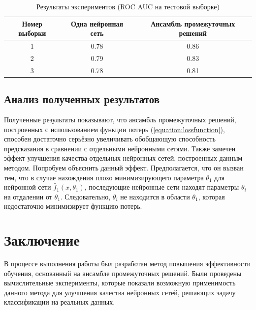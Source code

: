\documentclass[12pt, fleqn]{article}
\newcommand{\predictionfunction}{\hat{f}}
\newcommand{\reference}[1]{(\hyperref[#1]{\ref{#1}})}
\begin{document}
\begin{table}[h!]
	\begin{center}
		\begin{tabular}{|c|c|c|}
			\hline
			Номер выборки & Одна нейронная сеть & Ансамбль промежуточных решений \\
			\hline
			1 & 0.78 & 0.86 \\
			\hline
			2 & 0.79 & 0.83 \\
			\hline
			3 & 0.78 & 0.81 \\
			\hline
		\end{tabular}
	\end{center}
	
	\caption{Результаты экспериментов (ROC AUC на тестовой выборке)}
	\label{tabular:results}
\end{table}

\subsection{Анализ полученных результатов}

Полученные результаты показывают, что ансамбль промежуточных решений, построенных с использованием функции потерь \reference{equation:lossfunction}, способен достаточно серьёзно увеличивать обобщающую способность предсказания в сравнении с отдельными нейронными сетями.
Также замечен эффект улучшения качества отдельных нейронных сетей, построенных данным методом. Попробуем объяснить данный эффект. Предполагается, что он вызван тем, что в случае нахождения плохо минимизирующего параметра $\theta_1$ для нейронной сети $\predictionfunction_1(x, \theta_1)$, последующие нейронные сети находят параметры $\theta_i$ на отдалении от $\theta_1$. Следовательно, $\theta_i$ не находится в области $\theta_1$, которая недостаточно минимизирует функцию потерь.

\section{Заключение}

В процессе выполнения работы был разработан метод повышения эффективности обучения, основанный на ансамбле промежуточных решений.
Были проведены вычислительные эксперименты, которые показали возможную применимость данного метода для улучшения качества нейронных сетей, решающих задачу классификации на реальных данных.

\newpage

\renewcommand{\bibname}{Список литературы}
\addcontentsline{toc}{section}{\bibname}

\nocite{OptimalConvexCorrectingProcedures, ConvexCombinationsBestCorrelatedWithResponse}

\def\BibUrl#1.{}\def\BibAnnote#1.{}


\end{document}
